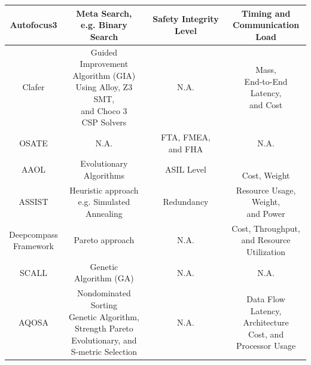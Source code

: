 \begin{longtable}{@{}>{\footnotesize}c >{\footnotesize}c >{\footnotesize}c >{\footnotesize}c@{}}
\midrule
Autofocus3  & \makecell {Meta Search, \\e.g. Binary Search} &Safety Integrity Level & \makecell{ Timing and\\ Communication\\ Load}\\ 
\midrule
Clafer & \makecell{Guided Improvement\\ Algorithm (GIA)\\ Using Alloy, Z3 SMT,\\ and Choco 3 \\CSP Solvers }  & N.A. & \makecell{Mass,\\ End-to-End Latency, \\ and Cost} \\ 
\midrule
OSATE & N.A. & \makecell{FTA, FMEA,\\ and FHA} & N.A.\\
\midrule
AAOL & Evolutionary Algorithms  & ASIL Level & \makecell{\\Cost, Weight}\\
\midrule
ASSIST & \makecell{Heuristic approach \\e.g. Simulated Annealing}  & Redundancy & \makecell{Resource Usage,\\ Weight,\\ and Power} \\
\midrule
\makecell {Deepcompass\\ Framework} & Pareto approach & N.A. & \makecell{Cost, Throughput,\\ and Resource\\ Utilization}\\
\midrule
SCALL & \makecell{Genetic \\Algorithm (GA)} & N.A. & N.A.\\
\midrule
AQOSA & \makecell{Nondominated Sorting\\ Genetic Algorithm,\\ Strength Pareto \\Evolutionary, and\\ S-metric Selection}  & N.A. & \makecell{Data Flow \\Latency,\\ Architecture \\Cost, and\\ Processor Usage}\\

\end{longtable}
